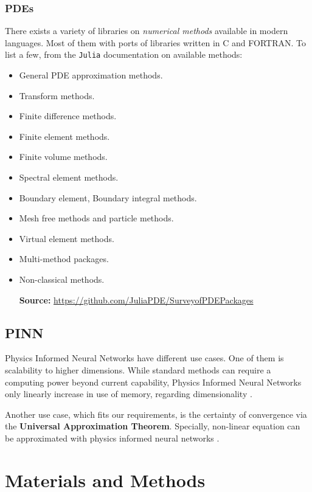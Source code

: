 \documentclass[11pt]{article}
\begin{document}
\subsubsection{PDEs}
\label{sec:orga87431a}
There exists a variety of libraries on \emph{numerical methods}
available in modern languages. Most of them with ports of libraries
written in C and FORTRAN. To list a few, from the \texttt{Julia}
documentation on available methods:

\begin{itemize}
\item General PDE approximation methods.
\item Transform methods.
\item Finite difference methods.
\item Finite element methods.
\item Finite volume methods.
\item Spectral element methods.
\item Boundary element, Boundary integral methods.
\item Mesh free methods and particle methods.
\item Virtual element methods.
\item Multi-method packages.
\item Non-classical methods.

\textbf{Source:} \url{https://github.com/JuliaPDE/SurveyofPDEPackages}
\end{itemize}
\subsection{PINN}
\label{sec:org6f2153b}
\label{sec:bib-PINN}

Physics Informed Neural Networks have different use cases. One of them is
scalability to higher dimensions. While standard methods can require a computing
power beyond current capability, Physics Informed Neural Networks only linearly
increase in use of memory, regarding dimensionality \cite{zubov2021neuralpde}.

Another use case, which fits our requirements, is the certainty of convergence
via the \textbf{Universal Approximation Theorem}. Specially, non-linear equation can be
approximated with physics informed neural networks \cite{raissi2019physics}.

\section{Materials and Methods}
\label{sec:org6eada4a}
\end{document}
